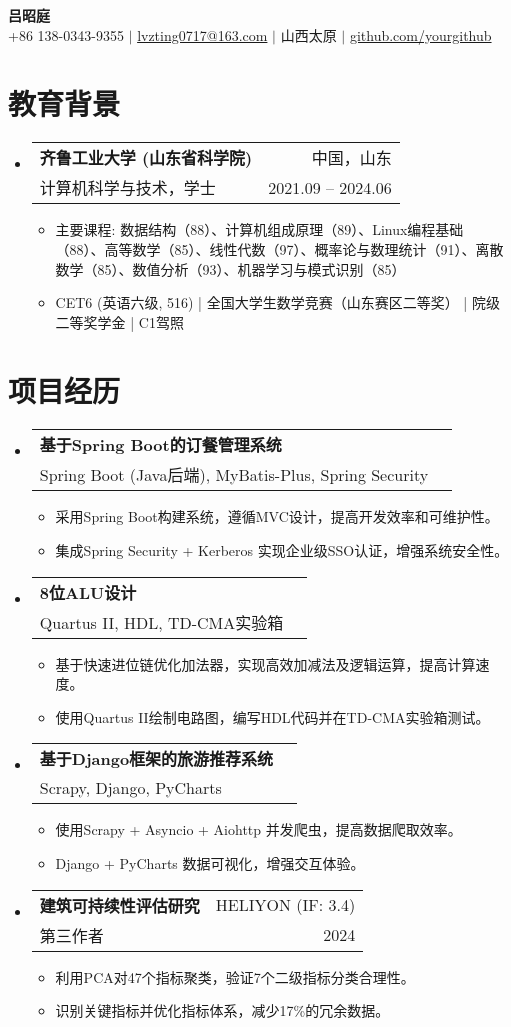 \documentclass[a4paper,11pt]{ctexart}
\makeatletter
\newenvironment{resumeList}{\begin{itemize}[leftmargin=*,label={}]}{\end{itemize}}
\newcommand{\resumeItem}[1]{\item\small{#1}}
\newcommand{\resumeEntry}[4]{
  \item \begin{tabular*}{0.97\textwidth}[t]{l@{\extracolsep{\fill}}r}
    \textbf{#1} & #2 \\
    #3 & #4 \\
  \end{tabular*}
}
\makeatother
\begin{document}
\begin{center}
    {\Huge\bfseries 吕昭庭} \\ \vspace{3pt}
    \small
    \faMobile \hspace{.5pt} +86 138-0343-9355 $|$ \faAt \hspace{.5pt} \href{mailto:lvzting0717@163.com}{lvzting0717@163.com} $|$ \faMapMarker \hspace{.5pt} 山西太原 $|$ \faGithub \hspace{.5pt} \href{https://github.com/yourgithub}{github.com/yourgithub}
\end{center}

\section{教育背景}
\begin{resumeList}
    \resumeEntry{齐鲁工业大学 (山东省科学院)}{中国，山东}{计算机科学与技术，学士}{2021.09 -- 2024.06}
    \begin{resumeList}
        \resumeItem{主要课程: 数据结构（88）、计算机组成原理（89）、Linux编程基础（88）、高等数学（85）、线性代数（97）、概率论与数理统计（91）、离散数学（85）、数值分析（93）、机器学习与模式识别（85）}
        \resumeItem{CET6 (英语六级, 516) | 全国大学生数学竞赛（山东赛区二等奖） | 院级二等奖学金 | C1驾照}
    \end{resumeList}
\end{resumeList}

\section{项目经历}
\begin{resumeList}
    \resumeEntry{基于Spring Boot的订餐管理系统}{}{Spring Boot (Java后端), MyBatis-Plus, Spring Security}{}
    \begin{resumeList}
        \resumeItem{采用Spring Boot构建系统，遵循MVC设计，提高开发效率和可维护性。}
        \resumeItem{集成Spring Security + Kerberos 实现企业级SSO认证，增强系统安全性。}
    \end{resumeList}
    \resumeEntry{8位ALU设计}{}{Quartus II, HDL, TD-CMA实验箱}{}
    \begin{resumeList}
        \resumeItem{基于快速进位链优化加法器，实现高效加减法及逻辑运算，提高计算速度。}
        \resumeItem{使用Quartus II绘制电路图，编写HDL代码并在TD-CMA实验箱测试。}
    \end{resumeList}
    \resumeEntry{基于Django框架的旅游推荐系统}{}{Scrapy, Django, PyCharts}{}
    \begin{resumeList}
        \resumeItem{使用Scrapy + Asyncio + Aiohttp 并发爬虫，提高数据爬取效率。}
        \resumeItem{Django + PyCharts 数据可视化，增强交互体验。}
    \end{resumeList}
    \resumeEntry{建筑可持续性评估研究}{HELIYON (IF: 3.4)}{第三作者}{2024}
    \begin{resumeList}
        \resumeItem{利用PCA对47个指标聚类，验证7个二级指标分类合理性。}
        \resumeItem{识别关键指标并优化指标体系，减少17\%的冗余数据。}
    \end{resumeList}
\end{resumeList}
\end{document}
